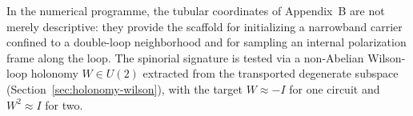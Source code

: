 In the numerical programme, the tubular coordinates of Appendix~B are not merely
descriptive: they provide the scaffold for initializing a narrowband carrier
confined to a double-loop neighborhood and for sampling an internal polarization
frame along the loop. The spinorial signature is tested via a non-Abelian
Wilson-loop holonomy $W\in U(2)$ extracted from the transported degenerate
subspace (Section~\ref{sec:holonomy-wilson}), with the target $W\approx -I$ for
one circuit and $W^2\approx I$ for two.